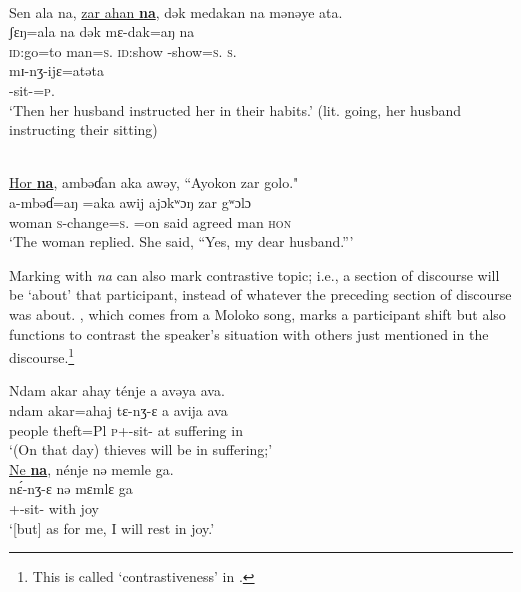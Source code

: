 \ea \label{ex:11:36}
\\
Sen  ala  na,  \underline{zar  ahan \textbf{na}},  dək  medakan  na  mənəye  ata.  \\
\gll  ʃɛŋ=ala   na            dək    mɛ-dak=aŋ na\\ 
      \textsc{id}:go=to  {\PSP}  man=\textsc{s}.{\POSS}    {\PSP}      \textsc{id}:show   {\NOM}-show=\textsc{s}.{\IO}   \textsc{s}.{\DO}\\   
      
      \medskip
\gll  mɪ-nʒ-ijɛ=atəta\\
      {\NOM}{}-sit-{\CL}=\textsc{p}.{\POSS}\\
\glt  ‘Then her husband instructed her in their habits.’  (lit. going, her husband instructing their sitting)    
\z

\ea \label{ex:11:37}
\\
\underline{Hor  \textbf{na}},  ambəɗan  aka  awəy, “Ayokon  zar  golo."\\
\gll  {}    a-mbəɗ=aŋ        =aka       awij    ajɔkʷɔŋ  zar  gʷɔlɔ\\
      woman {\PSP}  \textsc{s}-change=\textsc{s}.{\IO}    =on      said  agreed   man  \textsc{hon}\\
\glt  ‘The woman replied. She said, “Yes, my dear husband.”’
\z

Marking with \textit{na} can also mark contrastive topic; i.e., a section of discourse will be ‘about’ that participant, instead of whatever the preceding section of discourse was about. , which comes from a Moloko song, marks a participant shift but also functions to contrast the speaker’s situation with others just mentioned in the discourse.\footnote{This is called ‘contrastiveness’ in \citet{Chafe1976}.} 

\ea \label{ex:11:38}
Ndam  akar  ahay  ténje  a  avəya  ava.\\  
\gll  ndam akar=ahaj  tɛ-nʒ{}-ɛ    a  avija    ava \\ 
      people  theft=Pl  \textsc{p}+{\IFV}-sit-{\CL}  at  suffering  in\\ 
      \glt ‘(On that day) thieves will be in suffering;’\\
      
      \medskip
\underline{Ne  \textbf{na}},  nénje  nə  memle  ga.\\
\gll {}  n\'ɛ-nʒ{}-ɛ     nə  mɛmlɛ   ga\\
     {\oneS} {\PSP} {\oneS}+{\IFV}-sit-{\CL}  with  joy  {\ADJ}\\
\glt  ‘[but] as for me, I will rest in joy.’
\z


